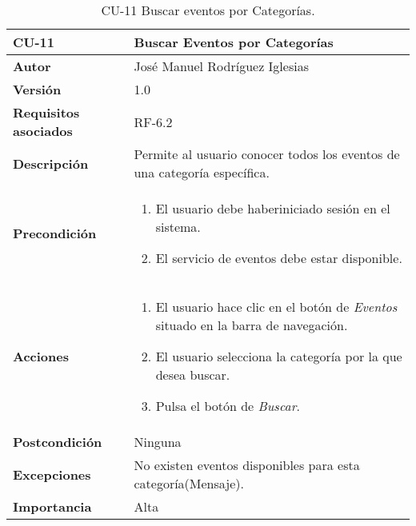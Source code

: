 \begin{table}[h]
	\centering
	\begin{tabularx}{\linewidth}{ p{} p{} }
		\toprule
		\textbf{CU-11}    & \textbf{Buscar Eventos por Categorías}\\
		\toprule
            \textbf{Autor}                & José Manuel Rodríguez Iglesias \\
		\textbf{Versión}              & 1.0    \\
		\textbf{Requisitos asociados} & RF-6.2 \\
		\textbf{Descripción}          & Permite al usuario conocer todos los eventos de una categoría específica. \\
		\textbf{Precondición}         &  
            \begin{enumerate}
			\def\labelenumi{\arabic{enumi}.}
			\tightlist
			\item El usuario debe haberiniciado sesión en el sistema.
			\item El servicio de eventos debe estar disponible.
		\end{enumerate}\\
    
		\textbf{Acciones}             &
		\begin{enumerate}
			\def\labelenumi{\arabic{enumi}.}
			\tightlist
                \item El usuario hace clic en el botón de\textit{ Eventos} situado en la barra de navegación.
			\item El usuario selecciona la categoría por la que desea buscar. 
                \item Pulsa el botón de \textit{Buscar}.
		\end{enumerate}\\
		\textbf{Postcondición}        & Ninguna \\
		\textbf{Excepciones}          & No existen eventos disponibles para esta categoría(Mensaje). \\
		\textbf{Importancia}          & Alta\\
		\bottomrule
	\end{tabularx}
	\caption{CU-11 Buscar eventos por Categorías.}
\end{table}

